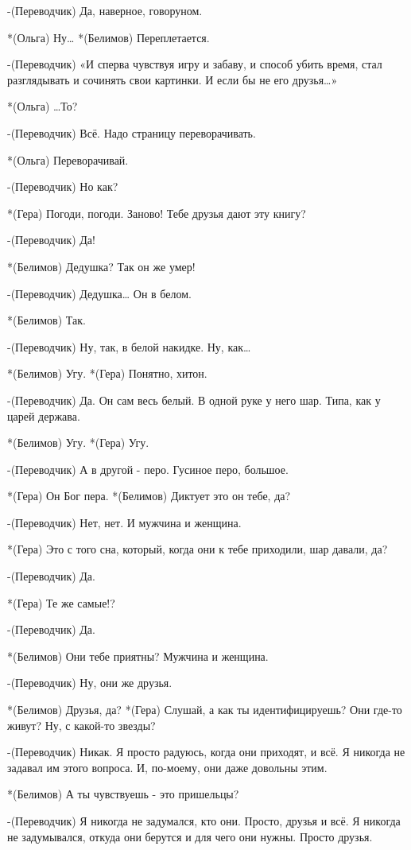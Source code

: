 -(Переводчик) Да, наверное, говоруном.

*(Ольга) Ну…
*(Белимов) Переплетается.

-(Переводчик) «И сперва чувствуя игру и забаву, и способ убить время, стал разглядывать и сочинять свои картинки. И если бы не его друзья…»

*(Ольга) …То?

-(Переводчик) Всё. Надо страницу переворачивать. 

*(Ольга) Переворачивай.


-(Переводчик) Но как? 

*(Гера) Погоди, погоди. Заново! Тебе друзья дают эту книгу?

-(Переводчик) Да!

*(Белимов) Дедушка? Так он же умер!     

-(Переводчик) Дедушка… Он в белом.

*(Белимов) Так.

-(Переводчик) Ну, так, в белой накидке. Ну, как…

*(Белимов) Угу.
*(Гера) Понятно, хитон.

-(Переводчик) Да. Он сам весь белый. В одной руке у него шар. Типа, как у царей держава.

*(Белимов) Угу.
*(Гера) Угу.

-(Переводчик) А в другой - перо. Гусиное перо, большое.

*(Гера) Он Бог пера.
*(Белимов) Диктует это он тебе, да?

-(Переводчик) Нет, нет. И мужчина и женщина.

*(Гера) Это с того сна, который, когда они к тебе приходили, шар давали, да?

-(Переводчик) Да.

*(Гера) Те же самые!?

-(Переводчик) Да.

*(Белимов) Они тебе приятны? Мужчина и женщина.

-(Переводчик) Ну, они же друзья.

*(Белимов) Друзья, да?
*(Гера) Слушай, а как ты идентифицируешь? Они где-то живут? Ну, с какой-то звезды?

-(Переводчик) Никак. Я просто радуюсь, когда  они приходят, и всё. Я никогда не задавал им этого вопроса. И, по-моему, они даже довольны этим.

*(Белимов) А ты чувствуешь - это пришельцы?

-(Переводчик) Я никогда не задумался, кто они. Просто, друзья и всё. Я никогда не задумывался, откуда они берутся и для чего они нужны. Просто друзья.

